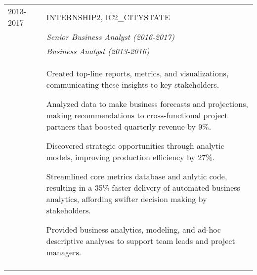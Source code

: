 \documentclass[a4paper,10pt]{article}
\begin{document}
\begin{supertabular}{l p{0.55cm} p{13.9cm}}
	\textsc{2013-2017}		&& \textsc{INTERNSHIP2}, IC2_CITYSTATE \\
												&& \small	\emph{Senior Business Analyst (2016-2017)} \\
												&& \small	\emph{Business Analyst (2013-2016)} \\
												&& \begin{enumerate*}[label =$\diamond$, itemjoin={\newline}]
														\item \footnotesize Created top-line reports, metrics, and visualizations, communicating these insights to key stakeholders.
														\item \footnotesize Analyzed data to make business forecasts and projections, making recommendations to cross-functional project partners that boosted quarterly revenue by 9\%.
														\item \footnotesize Discovered strategic opportunities through analytic models, improving production efficiency by 27\%.
														\item \footnotesize Streamlined core metrics database and anlytic code, resulting in a 35\% faster delivery of automated business analytics, affording swifter decision making by stakeholders.
														\item \footnotesize Provided business analytics, modeling, and ad-hoc descriptive analyses to support team leads and project managers.
													\end{enumerate*} \\
	 \\



\end{supertabular}





\smallskip
\end{document}
